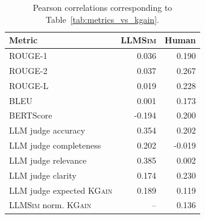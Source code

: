 \begin{table}[t]
\centering
\small
\begin{tabular}{lrr}
\toprule
Metric & \textsc{LLMSim} & Human \\
\midrule
ROUGE-1 & 0.036 & 0.190 \\
ROUGE-2 & 0.037 & 0.267 \\
ROUGE-L & 0.019 & 0.228 \\
BLEU & 0.001 & 0.173 \\
BERTScore & -0.194 & 0.200 \\
LLM judge accuracy & 0.354 & 0.202 \\
LLM judge completeness & 0.202 & -0.019 \\
LLM judge relevance & 0.385 & 0.002 \\
LLM judge clarity & 0.174 & 0.230 \\
LLM judge expected \textsc{KGain} & 0.189 & 0.119 \\
\textsc{LLMSim} norm. \textsc{KGain} & -- & 0.136 \\
\bottomrule
\end{tabular}
\caption{Pearson correlations corresponding to Table~\ref{tab:metrics_vs_kgain}.}
\label{tab:metrics_vs_kgain_pearson}
\end{table}
